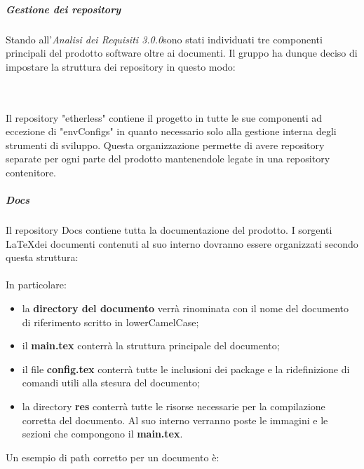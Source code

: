 \subparagraph*{Gestione dei repository}
Stando all'\textit{Analisi dei Requisiti 3.0.0}\doc sono stati individuati
tre componenti principali del prodotto software oltre ai documenti.
Il gruppo ha dunque deciso di impostare la struttura dei repository in questo modo:\\\\

\vspace{1cm}

\noindent \\Il repository "etherless" contiene il progetto in tutte le sue componenti
ad eccezione di "envConfigs" in quanto necessario solo alla gestione interna
degli strumenti di sviluppo. Questa organizzazione permette di avere repository separate per ogni parte
del prodotto mantenendole legate in una repository contenitore.

\subparagraph*{Docs}
Il repository Docs contiene tutta la documentazione del prodotto. I sorgenti \LaTeX \space dei documenti contenuti al suo interno dovranno essere organizzati secondo questa struttura:\\\\

\vspace{1cm}
\noindent In particolare:
\begin{itemize}
	\item la \textbf{directory del documento} verrà rinominata con il nome del documento di riferimento scritto in lowerCamelCase;
	\item il \textbf{main.tex} conterrà la struttura principale del documento;
	\item il file \textbf{config.tex} conterrà tutte le inclusioni dei package e la ridefinizione di comandi utili alla stesura del documento;
	\item la directory \textbf{res} conterrà tutte le risorse necessarie per la compilazione corretta del documento. Al suo interno verranno poste le immagini e le sezioni che compongono il \textbf{main.tex}.
\end{itemize}
Un esempio di path corretto per un documento è:\\

\centerline{}
\vspace{0.7cm}

